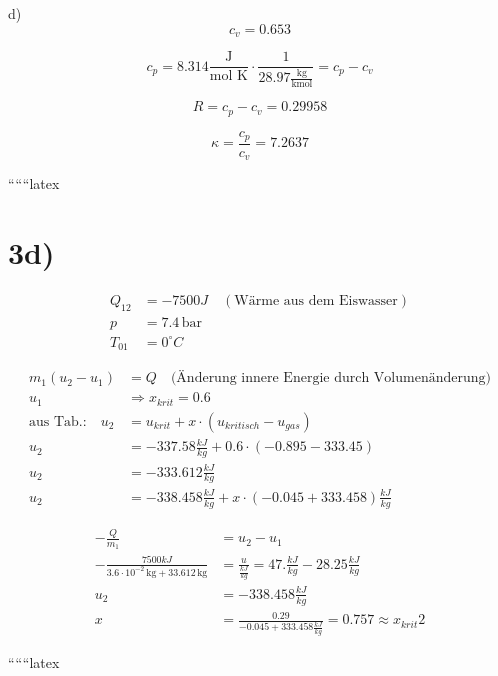 d) 
\[
c_v = 0.653
\]

\[
c_p = 8.314 \frac{\text{J}}{\text{mol K}} \cdot \frac{1}{28.97 \frac{\text{kg}}{\text{kmol}}} = c_p - c_v
\]

\[
R = c_p - c_v = 0.29958
\]

\[
\kappa = \frac{c_p}{c_v} = 7.2637
\]

``````latex



\section*{3d)}

\begin{align*}
Q_{12} &= -7500J \quad (\text{Wärme aus dem Eiswasser}) \\
p &= 7.4 \, \text{bar} \\
T_{01} &= 0^\circ C
\end{align*}

\begin{align*}
m_1 (u_2 - u_1) &= Q \quad \text{(Änderung innere Energie durch Volumenänderung)} \\
u_1 &\Rightarrow x_{krit} = 0.6 \\
\text{aus Tab.:} \quad u_2 &= u_{krit} + x \cdot (u_{kritisch} - u_{gas}) \\
u_2 &= -337.58 \frac{kJ}{kg} + 0.6 \cdot (-0.895 - 333.45) \\
u_2 &= -333.612 \frac{kJ}{kg} \\
u_2 &= -338.458 \frac{kJ}{kg} + x \cdot (-0.045 + 333.458) \frac{kJ}{kg}
\end{align*}

\begin{align*}
-\frac{Q}{m_1} &= u_2 - u_1 \\
-\frac{7500 kJ}{3.6 \cdot 10^{-2} \, \text{kg} + 33.612 \, \text{kg}} &= \frac{u}{\frac{kJ}{kg}} = 47. \frac{kJ}{kg} - 28.25 \frac{kJ}{kg} \\
u_2 &= -338.458 \frac{kJ}{kg} \\
x &= \frac{0.29}{-0.045 + 333.458 \frac{kJ}{kg}} = 0.757 \approx x_{krit} 2
\end{align*}

``````latex